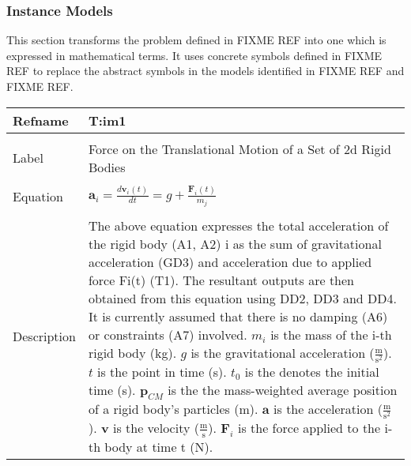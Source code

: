 \documentclass[12pt]{article}
\begin{document}
\subsubsection{Instance Models}
\label{Sec:InstMode}
This section transforms the problem defined in FIXME REF into one which is expressed in mathematical terms. It uses concrete symbols defined in FIXME REF to replace the abstract symbols in the models identified in FIXME REF and FIXME REF.
~\newline
\noindent \begin{minipage}{\textwidth}
\begin{tabular}{p{} p{}}
\toprule \textbf{Refname} & \textbf{T:im1}
\label{T:im1}
\\ \midrule \\
Label & Force on the Translational Motion of a Set of 2d Rigid Bodies
\\ \midrule \\
Equation & ${\mathbf{a}_{i}}=\frac{d {\mathbf{v}_{i}}\left(t\right)}{d t}=g+\frac{{\mathbf{F}_{i}}\left(t\right)}{{m_{j}}}$
\\ \midrule \\
Description & The above equation expresses the total acceleration of the rigid body (A1, A2) i as the sum of gravitational acceleration (GD3) and acceleration due to applied force Fi(t) (T1). The resultant outputs are then obtained from this equation using DD2, DD3 and DD4. It is currently assumed that there is no damping (A6) or constraints (A7) involved. ${m_{i}}$ is the mass of the i-th rigid body (kg). $g$ is the gravitational acceleration ($\frac{\text{m}}{\text{s}^{2}}$). $t$ is the point in time (s). ${t_{0}}$ is the denotes the initial time (s). ${\mathbf{p}_{CM}}$ is the the mass-weighted average position of a rigid body's particles (m). $\mathbf{a}$ is the acceleration ($\frac{\text{m}}{\text{s}^{2}}$). $\mathbf{v}$ is the velocity ($\frac{\text{m}}{\text{s}}$). ${\mathbf{F}_{i}}$ is the force applied to the i-th body at time t (N).
\\ \bottomrule \end{tabular}
\end{minipage}\\
~\newline
\end{document}
